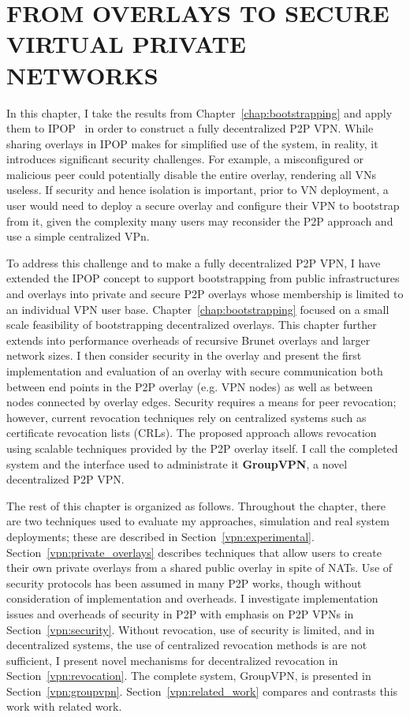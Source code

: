 \chapter{FROM OVERLAYS TO SECURE VIRTUAL PRIVATE NETWORKS}
\label{chap:security}

In this chapter, I take the results from Chapter~\ref{chap:bootstrapping} and
apply them to IPOP~\cite{ipop} in order to construct a fully decentralized P2P
VPN.  While sharing overlays in IPOP makes for simplified use of the system, in
reality, it introduces significant security challenges.  For example, a
misconfigured or malicious peer could potentially disable the entire overlay,
rendering all VNs useless.  If security and hence isolation is important, prior
to VN deployment, a user would need to deploy a secure overlay and configure
their VPN to bootstrap from it, given the complexity many users may reconsider
the P2P approach and use a simple centralized VPn.

To address this challenge and to make a fully decentralized P2P VPN, I have
extended the IPOP concept to support bootstrapping from public infrastructures
and overlays into private and secure P2P overlays whose membership is limited
to an individual VPN user base.  Chapter~\ref{chap:bootstrapping} focused on a
small scale feasibility of bootstrapping decentralized overlays.  This chapter
further extends into performance overheads of recursive Brunet overlays and
larger network sizes.  I then consider security in the overlay and present the
first implementation and evaluation of an overlay with secure communication
both between end points in the P2P overlay (e.g. VPN nodes) as well as between
nodes connected by overlay edges.  Security requires a means for peer
revocation; however, current revocation techniques rely on centralized systems
such as certificate revocation lists (CRLs). The proposed approach allows
revocation using scalable techniques provided by the P2P overlay itself.  I
call the completed system and the interface used to administrate it {\bf
GroupVPN}, a novel decentralized P2P VPN.

The rest of this chapter is organized as follows.  Throughout the chapter,
there are two techniques used to evaluate my approaches, simulation and real
system deployments; these are described in Section~\ref{vpn:experimental}.
Section~\ref{vpn:private_overlays} describes techniques that allow users to
create their own private overlays from a shared public overlay in spite of
NATs.  Use of security protocols has been assumed in many P2P works, though
without consideration of implementation and overheads. I investigate
implementation issues and overheads of security in P2P with emphasis on P2P
VPNs in Section~\ref{vpn:security}.  Without revocation, use of security is
limited, and in decentralized systems, the use of centralized revocation
methods is are not sufficient, I present novel mechanisms for decentralized
revocation in Section~\ref{vpn:revocation}.  The complete system, GroupVPN, is
presented in Section~\ref{vpn:groupvpn}.  Section~\ref{vpn:related_work}
compares and contrasts this work with related work.  

